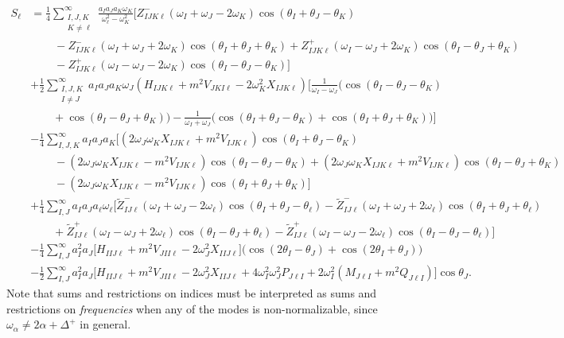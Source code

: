 \documentclass[letterpaper,11pt]{article}
\newcommand{\ol}{\omega_\ell}
\newcommand{\thl}{\theta_\ell}
\begin{document}
\begin{align}
\label{general source}
S_\ell &=\frac{1}{4} \sum_{\substack{I,J,K \\ K \neq \ell}}^\infty \frac{a_I a_J a_K \omega_K}{\ol^2 - \omega_K^2} \bigg[ Z^-_{IJK\ell} (\omega_I + \omega_J - 2\omega_K) \cos (\theta_I + \theta_J - \theta_K) \nonumber \\
%
&\qquad \frac{}{} - Z^-_{IJK\ell} (\omega_I + \omega_J + 2\omega_K) \cos (\theta_I + \theta_J + \theta_K) + Z^+_{IJK\ell} (\omega_I - \omega_J + 2\omega_K)  \cos(\theta_I - \theta_J + \theta_K) \nonumber \\
%
& \qquad \frac{}{} - Z^+_{IJK\ell} (\omega_I - \omega_J - 2\omega_K) \cos (\theta_I - \theta_J - \theta_K) \bigg] \nonumber \\
%
& + \frac{1}{2}\sum_{\substack{I,J,K \\ I \neq J}}^\infty a_I a_J a_K \omega_J \left( H_{IJK\ell} + m^2 V_{JKI\ell} - 2\omega_K^2 X_{IJK\ell} \right) \bigg[ \frac{1}{\omega_I - \omega_J} \big( \cos (\theta_I - \theta_J - \theta_K)  \nonumber \\
%
& \qquad + \cos(\theta_I - \theta_J + \theta_K) \big) - \frac{1}{\omega_I + \omega_J} \big( \cos (\theta_I + \theta_J - \theta_K)  + \cos ( \theta_I + \theta_J + \theta_K) \big) \bigg] \nonumber \\
%
& - \frac{1}{4} \sum_{I,J,K}^\infty a_I a_J a_K \bigg[ \left( 2\omega_J \omega_K X_{IJK\ell} + m^2 V_{IJK\ell} \right)\cos(\theta_I + \theta_J - \theta_K) \nonumber \\
%
& \qquad \frac{}{} -  \left( 2\omega_J\omega_K X_{IJK\ell} - m^2 V_{IJK\ell} \right) \cos(\theta_I - \theta_J - \theta_K) + \left(2\omega_J \omega_K X_{IJK\ell} + m^2 V_{IJK\ell} \right) \cos (\theta_I - \theta_J + \theta_K) \nonumber \\
%
& \qquad \frac{}{} - \left( 2\omega_J\omega_K X_{IJK\ell} - m^2 V_{IJK\ell} \right) \cos(\theta_I + \theta_J + \theta_K) \bigg] \nonumber \\
%
& + \frac{1}{4} \sum_{I,J}^\infty a_I a_J a_\ell \ol \Big[ \tilde Z^-_{IJ\ell} (\omega_I + \omega_J - 2\ol) \cos (\theta_I + \theta_J - \thl) - \tilde Z^-_{IJ\ell} (\omega_I + \omega_J + 2\ol) \cos(\theta_I + \theta_J +  \thl) \nonumber \\
%
& \qquad + \tilde Z^+_{IJ\ell} (\omega_I - \omega_J + 2\ol) \cos(\theta_I - \theta_J + \thl)  - \tilde Z^+_{IJ\ell} (\omega_I - \omega_J - 2\ol) \cos( \theta_I - \theta_J - \thl)  \Big] \nonumber \\
%
& - \frac{1}{4} \sum_{I,J}^\infty a_I^2 a_J \bigg[ H_{IIJ\ell} + m^2 V_{JII\ell} - 2\omega_J^2 X_{IIJ\ell} \bigg] \big( \cos (2\theta_I - \theta_J) + \cos (2\theta_I + \theta_J) \big) \nonumber \\
%
& - \frac{1}{2} \sum_{I,J}^\infty a_I^2 a_J \bigg[ H_{IIJ\ell} + m^2 V_{JII\ell} - 2\omega_J^2 X_{IIJ\ell} + 4\omega_I^2 \omega_J^2 P_{J\ell I} + 2\omega_I^2 (M_{J\ell I} + m^2 Q_{J\ell I}) \bigg] \cos \theta_J .
\end{align} 
Note that sums and restrictions on indices must be interpreted as sums and restrictions on \emph{frequencies} when any of the modes is non-normalizable, since $\omega_\alpha \neq 2 \alpha + \Delta^+$ in general.
\end{document}
